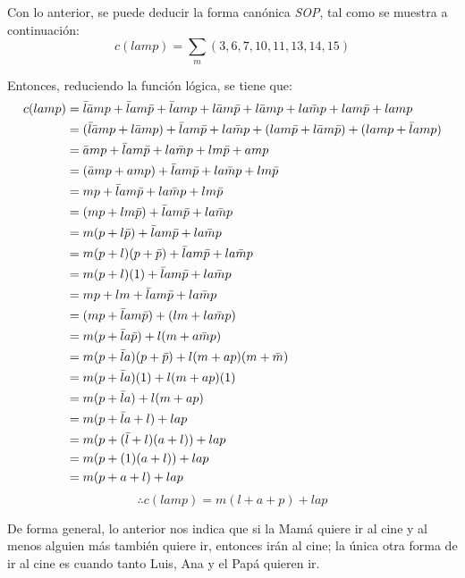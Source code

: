 \documentclass[../procedimientos.tex]{subfiles}
\begin{document}
Con lo anterior, se puede deducir la forma canónica \textit{SOP}, tal como se 
muestra a continuación:
\begin{equation*}
  c(lamp) = \sum_m (3, 6, 7, 10, 11, 13, 14, 15)
\end{equation*}

Entonces, reduciendo la función lógica, se tiene que:
\begin{align*}
  c(lamp) &= \bar{l}\bar{a}mp + \bar{l}am\bar{p} + \bar{l}amp  + l\bar{a}m\bar{p} + 
  l\bar{a}mp + la\bar{m}p + lam\bar{p} + lamp\\
  &= (\bar{l}\bar{a}mp + l\bar{a}mp) + \bar{l}am\bar{p} + la\bar{m}p + (lam\bar{p} + 
  l\bar{a}m\bar{p}) + (lamp + \bar{l}amp)\\
  &= \bar{a}mp + \bar{l}am\bar{p} + la\bar{m}p + lm\bar{p} + amp\\
  &= (\bar{a}mp + amp) + \bar{l}am\bar{p} + la\bar{m}p + lm\bar{p}\\
  &= mp + \bar{l}am\bar{p} + la\bar{m}p + lm\bar{p}\\
  &= (mp + lm\bar{p}) + \bar{l}am\bar{p} + la\bar{m}p\\
  &= m(p + l\bar{p}) + \bar{l}am\bar{p} + la\bar{m}p\\
  &= m(p + l)(p + \bar{p}) + \bar{l}am\bar{p} + la\bar{m}p\\
  &= m(p + l)(1) + \bar{l}am\bar{p} + la\bar{m}p\\
  &= mp + lm + \bar{l}am\bar{p} + la\bar{m}p\\
  &= (mp + \bar{l}am\bar{p}) + (lm + la\bar{m}p)\\
  &= m(p + \bar{l}a\bar{p}) + l(m + a\bar{m}p)\\
  &= m(p + \bar{l}a)(p + \bar{p}) + l(m + ap)(m + \bar{m})\\
  &= m(p + \bar{l}a)(1) + l(m + ap)(1)\\
  &= m(p + \bar{l}a) + l(m + ap)\\
  &= m(p + \bar{l}a + l) + lap\\
  &= m(p + (\bar{l} + l)(a + l)) + lap\\
  &= m(p + (1)(a + l)) + lap\\
  &= m(p + a + l) + lap
\end{align*}
\begin{equation*}
  \boxed {
    \therefore c(lamp) = m (l + a + p) + lap
  }
\end{equation*}

De forma general, lo anterior nos indica que si la Mamá quiere ir al cine y al 
menos alguien más también quiere ir, entonces irán al cine; la única otra 
forma de ir al cine es cuando tanto Luis, Ana y el Papá quieren ir.
\end{document}
